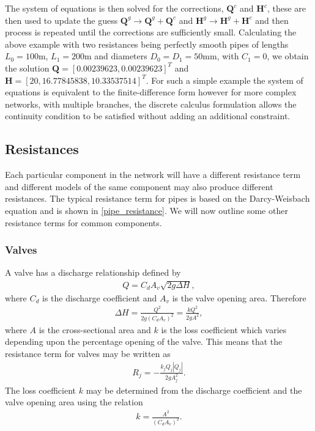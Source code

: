 \documentclass[12pt]{article}
\begin{document}
The system of equations is then solved for the corrections, $\mathbf{Q}^c$ and $\mathbf{H}^c$, these are then used to update the guess $\mathbf{Q}^g \rightarrow \mathbf{Q}^g + \mathbf{Q}^c $ and $\mathbf{H}^g \rightarrow \mathbf{H}^g + \mathbf{H}^c $ and then process is repeated until the corrections are sufficiently small. Calculating the above example with two resistances being perfectly smooth pipes of lengths $L_0 = 100$m, $L_1 = 200$m and diameters $D_0=D_1=50$mm, with $C_1=0$, we obtain the solution $\mathbf{Q} = [0.00239623, 0.00239623]^T$ and $\mathbf{H} = [20, 16.77845838, 10.33537514]^T$. For such a simple example the system of equations is equivalent to the finite-difference form however for more complex networks, with multiple branches, the discrete calculus formulation allows the continuity condition to be satisfied without adding an additional constraint. 

\subsection{Resistances}

Each particular component in the network will have a different resistance term and different models of the same component may also produce different resistances. The typical resistance term for pipes is based on the Darcy-Weisbach equation and is shown in \eqref{pipe_resistance}. We will now outline some other resistance terms for common components. 

\subsubsection{Valves}

A valve has a discharge relationship defined by 
\begin{align}
Q = C_d A_v \sqrt{2 g \Delta H},
\end{align}
where $C_d$ is the discharge coefficient and $A_v$ is the valve opening area. Therefore 
\begin{align}
\Delta H = \frac{Q^2}{2g\left(C_d A_v \right)^2} = \frac{k Q^2}{2 g A^2},
\end{align}
where $A$ is the cross-sectional area and $k$ is the loss coefficient which varies depending upon the percentage opening of the valve. This means that the resistance term for valves may be written as
\begin{align} \label{valve_resistance}
\boxed{ R_j = - \frac{k_j Q_j|Q_j| }{2 g A_j^2}. }
\end{align}
The loss coefficient $k$ may be determined from the discharge coefficient and the valve opening area using the relation 
\begin{align}
k = \frac{A^2}{\left(C_d A_v \right)^2}.
\end{align}
\end{document}
